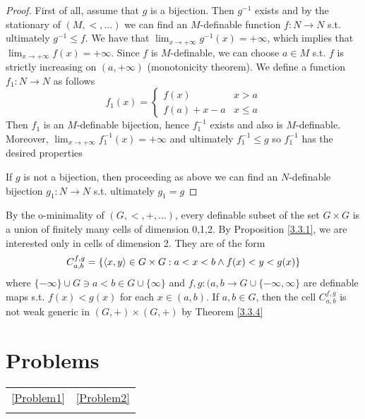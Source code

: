\documentclass[11pt]{article}
\begin{document}
\begin{proof}
First of all, assume that \(g\) is a bijection. Then \(g^{-1}\) exists and by the stationary
of \((M,<,\dots)\) we can find an \(M\)-definable function \(f:N\to N\) s.t. ultimately \(g^{-1}\le f\).
We have that \(\lim_{x\to+\infty}g^{-1}(x)=+\infty\), which implies that \(\lim_{x\to+\infty}f(x)=+\infty\). Since \(f\)
is \(M\)-definable, we can choose \(a\in M\) s.t. \(f\) is strictly increasing on \((a,+\infty)\)
(monotonicity theorem). We define a function \(f_1:N\to N\) as follows
\begin{equation*}
f_1(x)=
\begin{cases}
f(x)&x>a\\
f(a)+x-a&x\le a
\end{cases}
\end{equation*}
Then \(f_1\) is an \(M\)-definable bijection, hence \(f_1^{-1}\) exists and also
is \(M\)-definable. Moreover, \(\lim_{x\to+\infty}f_1^{-1}(x)=+\infty\) and ultimately \(f^{-1}_1\le g\)
so \(f_1^{-1}\) has the desired properties

If \(g\) is not a bijection, then proceeding as above we can find an \(N\)-definable
bijection \(g_1:N\to N\) s.t. ultimately \(g_1=g\)
\end{proof}

By the o-minimality of \((G,<,+,\dots)\), every definable subset of the set \(G\times G\) is a union of
finitely many cells of dimension 0,1,2. By Proposition \ref{3.3.1}, we are interested only in
cells of dimension 2. They are of the form
\begin{equation*}
C_{a,b}^{f,g}=\{\langle x,y\rangle\in G\times G:a<x<b\wedge f(x)<y<g(x)\}
\end{equation*}
where \(\{-\infty\}\cup G\ni a<b\in G\cup\{\infty\}\) and \(f,g:(a,b\to G\cup\{-\infty,\infty\}\) are definable maps s.t. \(f(x)<g(x)\)
for each \(x\in(a,b)\). If \(a,b\in G\), then the cell \(C_{a,b}^{f,g}\) is not weak generic
in \((G,+)\times(G,+)\) by Theorem \ref{3.3.4}





\section{Problems}
\label{sec:org1303290}
\begin{center}
\begin{tabular}{ll}
\ref{Problem1} & \ref{Problem2}\\
\\
\end{tabular}
\end{center}
\end{document}
